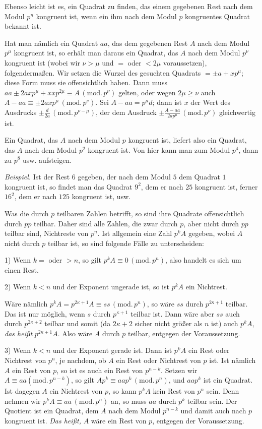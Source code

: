 Ebenso leicht ist es, ein Quadrat zu finden, das einem gegebenen Rest nach dem Modul $p^n$ kongruent ist, wenn ein ihm nach dem Modul $p$ kongruentes Quadrat bekannt ist.

Hat man nämlich ein Quadrat $aa$, das dem gegebenen Rest $A$ nach dem Modul $p^\mu$ kongruent ist, so erhält man daraus ein Quadrat, das $A$ nach dem Modul $p^\nu$ kongruent ist (wobei wir $\nu>\mu$ und $=$ oder $<2\mu$ voraussetzen), folgendermaßen. Wir setzen die Wurzel des gesuchten Quadrats $=\pm a+xp^\mu$; diese Form muss sie offensichtlich haben. Dann muss $aa\pm2axp^\mu+xxp^{2\mu}\equiv A\,(\mathrm{mod.}\,p^\nu)$ gelten, oder wegen $2\mu\geq\nu$ auch $A-aa\equiv\pm2axp^\mu\,(\mathrm{mod.}\,p^\nu)$. Sei $A-aa=p^{\mu}d$; dann ist $x$ der Wert des Ausdrucks $\pm\frac{d}{2a}\,(\mathrm{mod.}\,p^{\nu-\mu})$, der dem Ausdruck $\pm\frac{A-aa}{2ap^\mu}\,(\mathrm{mod.}\,p^\nu)$ gleichwertig ist.

Ein Quadrat, das $A$ nach dem Modul $p$ kongruent ist, liefert also ein Quadrat, das $A$ nach dem Modul $p^2$ kongruent ist. Von hier kann man zum Modul $p^4$, dann zu $p^8$ usw. aufsteigen.

\emph{Beispiel.} Ist der Rest $6$ gegeben, der nach dem Modul $5$ dem Quadrat $1$ kongruent ist, so findet man das Quadrat $9^2$, dem er nach $25$ kongruent ist, ferner $16^2$, dem er nach $125$ kongruent ist, usw.

Was die durch $p$ teilbaren Zahlen betrifft, so sind ihre Quadrate offensichtlich durch $pp$ teilbar. Daher sind alle Zahlen, die zwar durch $p$, aber nicht durch $pp$ teilbar sind, Nichtreste von $p^n$. Ist allgemein eine Zahl $p^k A$ gegeben, wobei $A$ nicht durch $p$ teilbar ist, so sind folgende Fälle zu unterscheiden:

1) Wenn $k=$ oder $>n$, so gilt $p^k A\equiv0\,(\mathrm{mod.}\,p^n)$, also handelt es sich um einen Rest.

2) Wenn $k<n$ und der Exponent ungerade ist, so ist $p^k A$ ein Nichtrest.

Wäre nämlich $p^k A=p^{2\kappa+1}A\equiv ss\,(\mathrm{mod.}\,p^n)$, so wäre $ss$ durch $p^{2\kappa+1}$ teilbar. Das ist nur möglich, wenn $s$ durch $p^{\kappa+1}$ teilbar ist. Dann wäre aber $ss$ auch durch $p^{2\kappa+2}$ teilbar und somit (da $2\kappa+2$ sicher nicht größer als $n$ ist) auch $p^k A$, \emph{das heißt} $p^{2\kappa+1}A$. Also wäre $A$ durch $p$ teilbar, entgegen der Voraussetzung.

3) Wenn $k<n$ und der Exponent gerade ist. Dann ist $p^k A$ ein Rest oder Nichtrest von $p^n$, je nachdem, ob $A$ ein Rest oder Nichtrest von $p$ ist. Ist nämlich $A$ ein Rest von $p$, so ist es auch ein Rest von $p^{n-k}$. Setzen wir $A\equiv aa (\mathrm{mod.}\,p^{n-k})$, so gilt $Ap^k\equiv aap^k\,(\mathrm{mod.}\,p^n)$, und $aap^k$ ist ein Quadrat. Ist dagegen $A$ ein Nichtrest von $p$, so kann $p^k A$ kein Rest von $p^n$ sein. Denn nehmen wir $p^k A\equiv aa\,(\mathrm{mod.}\,p^n)$ an, so muss $aa$ durch $p^k$ teilbar sein. Der Quotient ist ein Quadrat, dem $A$ nach dem Modul $p^{n-k}$ und damit auch nach $p$ kongruent ist. \emph{Das heißt,} $A$ wäre ein Rest von $p$, entgegen der Voraussetzung.

